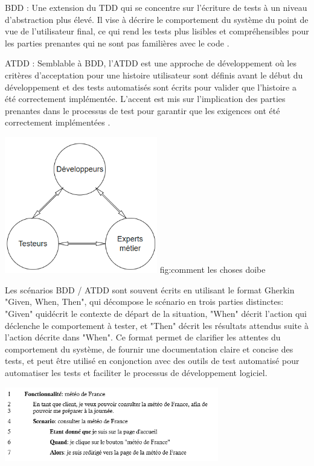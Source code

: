 BDD : Une extension du TDD qui se concentre sur l'écriture de tests à un niveau d'abstraction plus élevé. Il vise à décrire le comportement du système du point de vue de l'utilisateur final, ce qui rend les tests plus lisibles et compréhensibles pour les parties prenantes qui ne sont pas familières avec le code \parencite{Bdd}.

ATDD : Semblable à BDD, l'ATDD est une approche de développement où les critères d'acceptation pour une histoire utilisateur sont définis avant le début du développement et des tests automatisés sont écrits pour valider que l'histoire a été correctement implémentée. L'accent est mis sur l'implication des parties prenantes dans le processus de test pour garantir que les exigences ont été correctement implémentées \parencite{AtddBook}.
\begin{center}
    \includegraphics[width=0.5\textwidth]{interaction.png}
    \linebreak
fig:comment les choses doibe
\end{center}

Les scénarios BDD / ATDD sont souvent écrits en utilisant le format Gherkin "Given, When, Then", qui décompose le scénario en trois parties distinctes: "Given" quidécrit le contexte de départ de la situation, "When" décrit l'action qui déclenche le comportement à tester, et "Then" décrit les résultats attendus suite à l'action décrite dans "When". Ce format permet de clarifier les attentes du comportement du système, de fournir une documentation claire et concise des tests, et peut être utilisé en conjonction avec des outils de test automatisé pour automatiser les tests et faciliter le processus de développement logiciel.
\begin{center}
    \includegraphics[width=0.7\textwidth]{feature.png}

\end{center}

